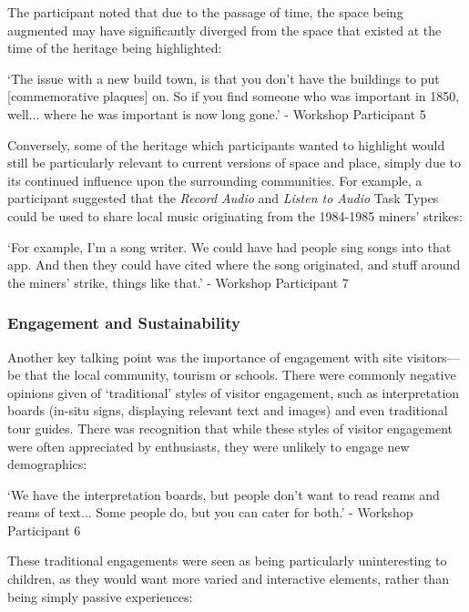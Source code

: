 The participant noted that due to the passage of time, the space being augmented may have significantly diverged from the space that existed at the time of the heritage being highlighted:

\begin{displayquote}
`The issue with a new build town, is that you don't have the buildings to put [commemorative plaques] on. So if you find someone who was important in 1850, well... where he was important is now long gone.' - Workshop Participant 5
\end{displayquote}

Conversely, some of the heritage which participants wanted to highlight would still be particularly relevant to current versions of space and place, simply due to its continued influence upon the surrounding communities. For example, a participant suggested that the \textit{Record Audio} and \textit{Listen to Audio} Task Types could be used to share local music originating from the 1984-1985 miners' strikes:

\begin{displayquote}
`For example, I'm a song writer. We could have had people sing songs into that app. And then they could have cited where the song originated, and stuff around the miners' strike, things like that.' - Workshop Participant 7
\end{displayquote}

\subsubsection{Engagement and Sustainability}

Another key talking point was the importance of engagement with site visitors---be that the local community, tourism or schools. There were commonly negative opinions given of `traditional' styles of visitor engagement, such as interpretation boards (in-situ signs, displaying relevant text and images) and even traditional tour guides. There was recognition that while these styles of visitor engagement were often appreciated by enthusiasts, they were unlikely to engage new demographics:

\begin{displayquote}
`We have the interpretation boards, but people don't want to read reams and reams of text... Some people do, but you can cater for both.' - Workshop Participant 6
\end{displayquote}

These traditional engagements were seen as being particularly uninteresting to children, as they would want more varied and interactive elements, rather than being simply passive experiences:

